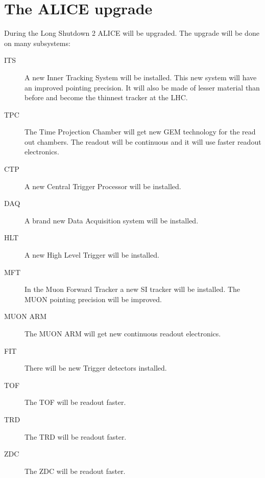 \section{The ALICE upgrade}
During the Long Shutdown 2 ALICE will be upgraded. The upgrade will be done on many subsystems:
\begin{description}
  \item[ITS] A new Inner Tracking System will be installed. This new system will have an improved pointing precision. It will also be made of lesser material than before and become the thinnest tracker at the LHC.
  \item[TPC] The Time Projection Chamber will get new GEM technology for the read out chambers. The readout will be continuous and it will use faster readout electronics.
  \item[CTP] A new Central Trigger Processor will be installed.
  \item[DAQ] A brand new Data Acquisition system will be installed.
  \item[HLT] A new High Level Trigger will be installed.
  \item[MFT] In the Muon Forward Tracker a new SI tracker will be installed. The MUON pointing precision will be improved.
  \item[MUON ARM] The MUON ARM will get new continuous readout electronics.
  \item[FIT] There will be new Trigger detectors installed.
  \item[TOF] The TOF will be readout faster.
  \item[TRD] The TRD will be readout faster.
  \item[ZDC] The ZDC will be readout faster.
\end{description}

